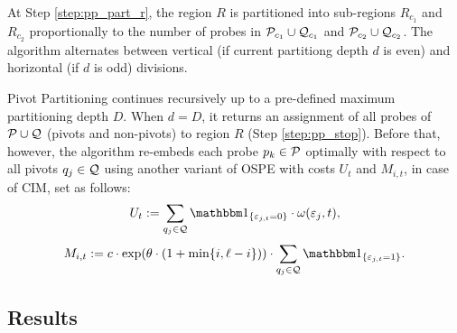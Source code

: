 At Step \ref{step:pp_part_r}, the region $R$ is partitioned into sub-regions
$R_{c_1}$ and $R_{c_2}$ proportionally to the number of probes in
${\mathcal{P}}_{c_1} \cup {\mathcal{Q}}_{c_1}$ and ${\mathcal{P}}_{c_2} \cup {\mathcal{Q}}_{c_2}$. The algorithm
alternates between vertical (if current partitiong depth $d$ is even) and
horizontal (if $d$ is odd) divisions.

Pivot Partitioning continues recursively up to a pre-defined maximum
partitioning depth $D$. When $d=D$, it returns an assignment of all probes of
${\mathcal{P}} \cup {\mathcal{Q}}$ (pivots and non-pivots) to region $R$ (Step
\ref{step:pp_stop}). Before that, however, the algorithm re-embeds each probe
$p_k \in {\mathcal{P}}$ optimally with respect to all pivots $q_j \in {\mathcal{Q}}$ using
another variant of OSPE with costs $U_t$ and $M_{i,t}$, in case of CIM, set as
follows:
\[
U_t := \sum_{q_j \in \CalQ} \Ind{\eps_{j,t}=0} \cdot \omega(\eps_{j},t),
\]
\[
M_{i,t} := c \cdot \exp(\theta\cdot (1+\min\{i,\ell-i\}))
           \cdot \sum_{q_j \in \CalQ} \Ind{\eps_{j,t}=1}.
\]

\subsection{Results}

